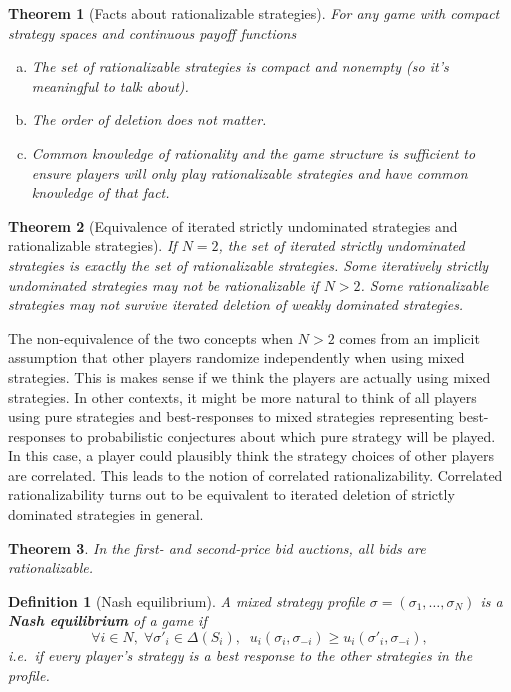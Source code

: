 \documentclass[letter, 10pt]{article}
\theoremstyle{basic}
\newtheorem{definition}{Definition}[section]
\newtheorem{theorem}{Theorem}[section]
\begin{document}
\begin{spacing}{1.1}
\begin{theorem}[Facts about rationalizable strategies]
  For any game with compact
  strategy spaces and continuous payoff functions
  \begin{enumerate}[a)]\leftskip = 1em
  \item The set of rationalizable strategies is compact and
    nonempty (so it's meaningful to talk about).
  \item The order of deletion does not matter.
  \item Common knowledge of rationality and the game structure is
    sufficient to ensure players will only play rationalizable strategies
    and have common knowledge of that fact.
  \end{enumerate}
\end{theorem}

\begin{theorem}[Equivalence of iterated strictly undominated strategies and
  rationalizable strategies]
  If $N=2$, the set of iterated strictly
  undominated strategies is exactly the set of rationalizable
  strategies. Some iteratively strictly undominated strategies may not be
  rationalizable if $N>2$. Some rationalizable strategies may not survive
  iterated deletion of weakly dominated strategies.
\end{theorem}

The non-equivalence of the two concepts when $N>2$ comes from an implicit
assumption that other players randomize independently when using mixed
strategies. This is makes sense if we think the players are
actually using mixed strategies. In other contexts, it might be more
natural to think of all players using pure strategies and best-responses to
mixed strategies representing best-responses to probabilistic conjectures
about which pure strategy will be played. In this case, a player could
plausibly think the strategy choices of other players are correlated. This
leads to the notion of correlated rationalizability. Correlated
rationalizability turns out to be equivalent to iterated deletion of
strictly dominated strategies in general.

\begin{theorem}
  In the first- and second-price bid auctions, all bids are rationalizable.
\end{theorem}

\begin{definition}[Nash equilibrium]
  A mixed strategy profile $\sigma = \left(\sigma_1,
    \ldots, \sigma_N\right)$ is a \textbf{Nash equilibrium} of a game
  if \[\forall i \in N,\; \forall \sigma'_i\in \Delta(S_i),\;\;
  u_i(\sigma_i, \sigma_{-i}) \geq u_i(\sigma'_i, \sigma_{-i}),\] i.e.~if
  every player's strategy is a best response to the other strategies in the
  profile.
\end{definition}


\end{spacing}
\end{document}
